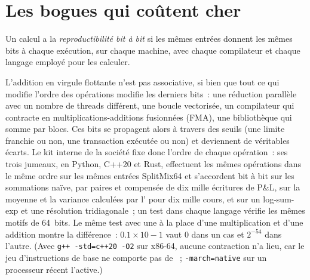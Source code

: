 \section{Les bogues qui coûtent cher}

\begin{definition}\label{def:qm:floating-point-and-numerical-linear-algebra:repro}
Un calcul a la \emph{reproductibilité bit à bit} si les mêmes entrées donnent les mêmes bits à chaque exécution, sur chaque machine, avec chaque compilateur et chaque langage employé pour les calculer.
\end{definition}

L'addition en virgule flottante n'est pas associative, si bien que tout ce qui modifie l'ordre des opérations modifie les derniers bits~: une réduction parallèle avec un nombre de threads différent, une boucle vectorisée, un
compilateur qui contracte en multiplications-additions fusionnées (FMA), une bibliothèque qui somme par blocs. Ces bits se propagent alors à travers des seuils (une limite franchie ou non, une transaction exécutée ou non) et deviennent de véritables
écarts. Le kit interne de la société fixe donc l'ordre de chaque opération~: ses trois jumeaux, en Python, C++20 et Rust, effectuent les mêmes opérations dans le même ordre sur les mêmes entrées SplitMix64
et s'accordent bit à bit sur les sommations naïve, par paires et compensée de dix mille écritures de P\&L, sur la moyenne et la variance calculées par l' pour dix mille cours, et sur un log-sum-exp et une résolution tridiagonale~; un
test dans chaque langage vérifie les mêmes motifs de 64~bits. Le même test avec une  à la place d'une multiplication et d'une addition montre la différence~: $0.1 \times 10 - 1$ vaut 0 dans un cas et $2^{-54}$
dans l'autre. (Avec \texttt{g++ -std=c++20 -O2} sur x86-64, aucune contraction n'a lieu, car le jeu d'instructions de base ne comporte pas de ~; \texttt{-march=native} sur un processeur
récent l'active.)

